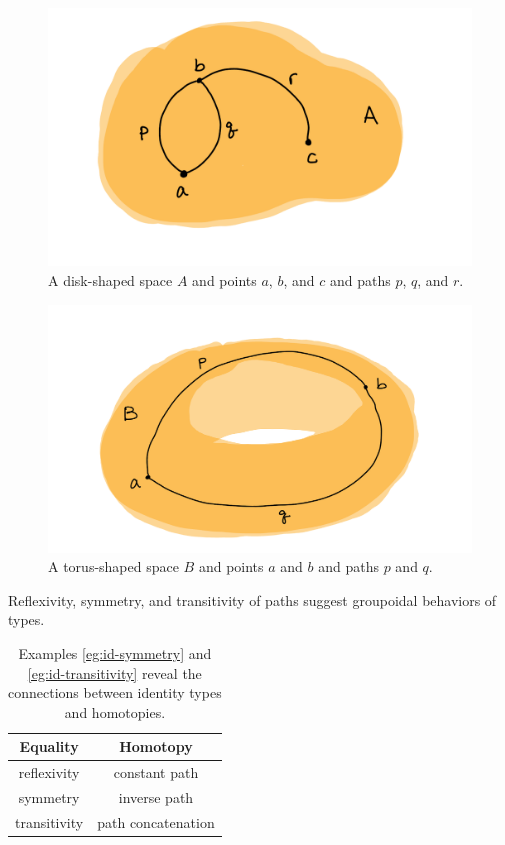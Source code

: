 \documentclass{amsart}
\theoremstyle{definition}
\begin{document}
\begin{figure}[h]
    \centering
    \includegraphics[scale=0.5]{disk.png}
    \caption{A disk-shaped space $A$ and points $a$, $b$, and $c$ and paths $p$, $q$, and $r$.}
    \label{fig:disk}
\end{figure}

\begin{figure}[h]
    \centering
    \includegraphics[scale=0.5]{torus.png}
    \caption{A torus-shaped space $B$ and points $a$ and $b$ and paths $p$ and $q$.}
    \label{fig:torus}
\end{figure}

Reflexivity, symmetry, and transitivity of paths suggest groupoidal behaviors of types.

\begin{table}[h]
    \centering
    \begin{tabular}{|c|c|}\hline
        Equality & Homotopy \\\hline
        reflexivity & constant path \\\hline
        symmetry & inverse path \\\hline
        transitivity & path concatenation \\\hline
    \end{tabular}
    \caption{Examples \ref{eg:id-symmetry} and \ref{eg:id-transitivity} reveal the connections between identity types and homotopies.}
    \label{tab:equalities-and-homotopy}
\end{table}
\end{document}
